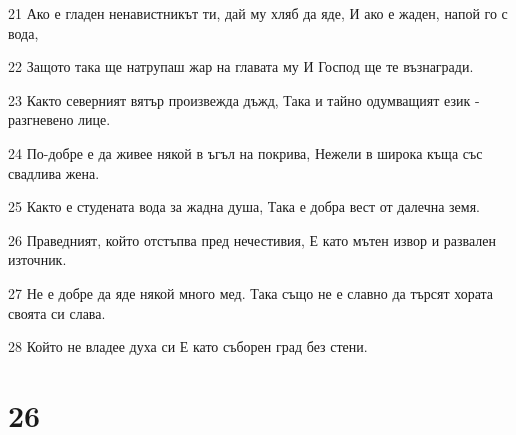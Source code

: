\par 21 Ако е гладен ненавистникът ти, дай му хляб да яде, И ако е жаден, напой го с вода,
\par 22 Защото така ще натрупаш жар на главата му И Господ ще те възнагради.
\par 23 Както северният вятър произвежда дъжд, Така и тайно одумващият език - разгневено лице.
\par 24 По-добре е да живее някой в ъгъл на покрива, Нежели в широка къща със свадлива жена.
\par 25 Както е студената вода за жадна душа, Така е добра вест от далечна земя.
\par 26 Праведният, който отстъпва пред нечестивия, Е като мътен извор и развален източник.
\par 27 Не е добре да яде някой много мед. Така също не е славно да търсят хората своята си слава.
\par 28 Който не владее духа си Е като съборен град без стени.

\chapter{26}

